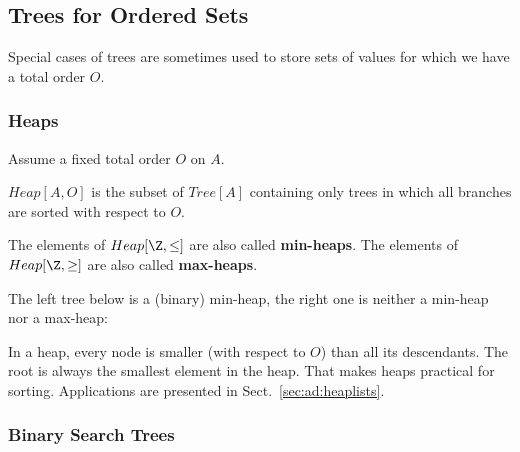 \subsection{Trees for Ordered Sets}

Special cases of trees are sometimes used to store sets of values for which we have a total order $O$.

\subsubsection{Heaps}\label{sec:ad:heaps}

Assume a fixed total order $O$ on $A$.

\begin{definition}[Heap]
$Heap[A,O]$ is the subset of $Tree[A]$ containing only trees in which all branches are sorted with respect to $O$.
\end{definition}

The elements of $Heap[\Z,\leq]$ are also called \textbf{min-heaps}.
The elements of $Heap[\Z,\geq]$ are also called \textbf{max-heaps}.

The left tree below is a (binary) min-heap, the right one is neither a min-heap nor a max-heap:

\begin{center}
\tb\tb
{}
\end{center}

In a heap, every node is smaller (with respect to $O$) than all its descendants.
The root is always the smallest element in the heap.
That makes heaps practical for sorting.
Applications are presented in Sect.~\ref{sec:ad:heaplists}.

\subsubsection{Binary Search Trees}

